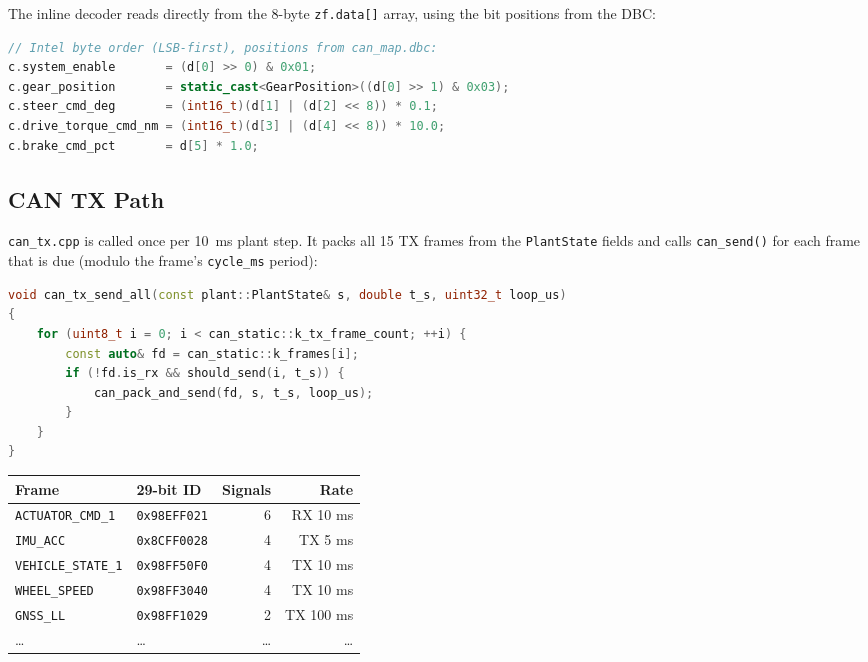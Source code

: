 \documentclass[11pt,a4paper]{article}
\begin{document}
The inline decoder reads directly from the 8-byte \texttt{zf.data[]} array,
using the bit positions from the DBC:

\begin{lstlisting}[language=C++, caption={ACTUATOR\_CMD\_1 inline decoder}]
// Intel byte order (LSB-first), positions from can_map.dbc:
c.system_enable       = (d[0] >> 0) & 0x01;
c.gear_position       = static_cast<GearPosition>((d[0] >> 1) & 0x03);
c.steer_cmd_deg       = (int16_t)(d[1] | (d[2] << 8)) * 0.1;
c.drive_torque_cmd_nm = (int16_t)(d[3] | (d[4] << 8)) * 10.0;
c.brake_cmd_pct       = d[5] * 1.0;
\end{lstlisting}

\subsection{CAN TX Path}

\texttt{can\_tx.cpp} is called once per \SI{10}{ms} plant step. It packs all
15 TX frames from the \texttt{PlantState} fields and calls \texttt{can\_send()}
for each frame that is due (modulo the frame's \texttt{cycle\_ms} period):

\begin{lstlisting}[language=C++, caption={CAN TX dispatch loop (simplified)}]
void can_tx_send_all(const plant::PlantState& s, double t_s, uint32_t loop_us)
{
    for (uint8_t i = 0; i < can_static::k_tx_frame_count; ++i) {
        const auto& fd = can_static::k_frames[i];
        if (!fd.is_rx && should_send(i, t_s)) {
            can_pack_and_send(fd, s, t_s, loop_us);
        }
    }
}
\end{lstlisting}

\begin{center}
\begin{tabular}{llrr}
\toprule
Frame & 29-bit ID & Signals & Rate \\
\midrule
\texttt{ACTUATOR\_CMD\_1} & \texttt{0x98EFF021} & 6 & RX 10 ms \\
\texttt{IMU\_ACC} & \texttt{0x8CFF0028} & 4 & TX 5 ms \\
\texttt{VEHICLE\_STATE\_1} & \texttt{0x98FF50F0} & 4 & TX 10 ms \\
\texttt{WHEEL\_SPEED} & \texttt{0x98FF3040} & 4 & TX 10 ms \\
\texttt{GNSS\_LL} & \texttt{0x98FF1029} & 2 & TX 100 ms \\
\ldots & \ldots & \ldots & \ldots \\
\bottomrule
\end{tabular}
\end{center}
\end{document}
